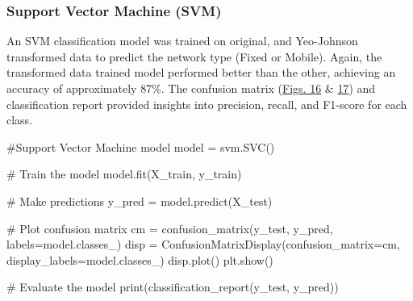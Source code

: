 \documentclass[
  letterpaper,
  DIV=11,
  numbers=noendperiod,
  oneside]{scrartcl}
\newenvironment{Shaded}{\begin{snugshade}}{\end{snugshade}}
\newcommand{\BuiltInTok}[1]{\textcolor[rgb]{0.00,0.23,0.31}{#1}}
\newcommand{\CommentTok}[1]{\textcolor[rgb]{0.37,0.37,0.37}{#1}}
\newcommand{\NormalTok}[1]{\textcolor[rgb]{0.00,0.23,0.31}{#1}}
\newcommand{\OperatorTok}[1]{\textcolor[rgb]{0.37,0.37,0.37}{#1}}
\begin{document}
\hypertarget{support-vector-machine-svm}{%
\subsubsection{Support Vector Machine
(SVM)}\label{support-vector-machine-svm}}

An SVM classification model was trained on original, and Yeo-Johnson
transformed data to predict the network type (Fixed or Mobile). Again,
the transformed data trained model performed better than the other,
achieving an accuracy of approximately 87\%. The confusion matrix
(\protect\hyperlink{fig-orgvector}{Figs. 16} \&
\protect\hyperlink{fig-transvector}{17}) and classification report
provided insights into precision, recall, and F1-score for each class.

\begin{Shaded}
\begin{Highlighting}[]
\CommentTok{\#Support Vector Machine model}
\NormalTok{model }\OperatorTok{=}\NormalTok{ svm.SVC()}

\CommentTok{\# Train the model}
\NormalTok{model.fit(X\_train, y\_train)}

\CommentTok{\# Make predictions}
\NormalTok{y\_pred }\OperatorTok{=}\NormalTok{ model.predict(X\_test)}

\CommentTok{\# Plot confusion matrix}
\NormalTok{cm }\OperatorTok{=}\NormalTok{ confusion\_matrix(y\_test, y\_pred, labels}\OperatorTok{=}\NormalTok{model.classes\_)}
\NormalTok{disp }\OperatorTok{=}\NormalTok{ ConfusionMatrixDisplay(confusion\_matrix}\OperatorTok{=}\NormalTok{cm, display\_labels}\OperatorTok{=}\NormalTok{model.classes\_)}
\NormalTok{disp.plot()}
\NormalTok{plt.show()}

\CommentTok{\# Evaluate the model}
\BuiltInTok{print}\NormalTok{(classification\_report(y\_test, y\_pred))}
\end{Highlighting}
\end{Shaded}
\end{document}
